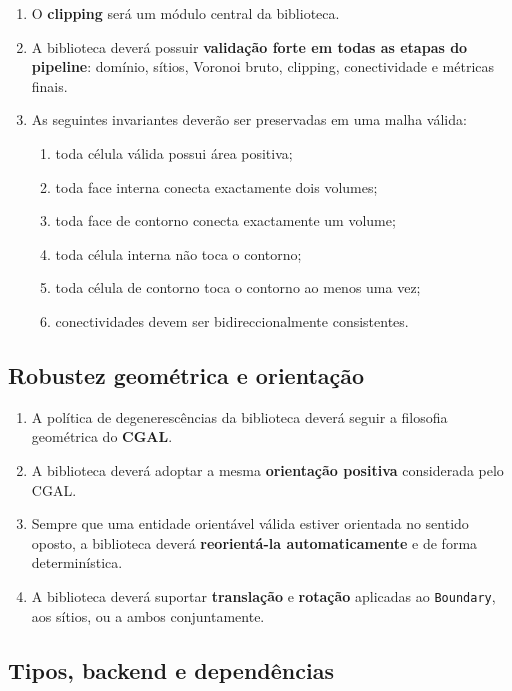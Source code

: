 \begin{enumerate}
    \item O \textbf{clipping} será um módulo central da biblioteca.
    \item A biblioteca deverá possuir \textbf{validação forte em todas as etapas do pipeline}: domínio, sítios, Voronoi bruto, clipping, conectividade e métricas finais.
    \item As seguintes invariantes deverão ser preservadas em uma malha válida:
    \begin{enumerate}
        \item toda célula válida possui área positiva;
        \item toda face interna conecta exactamente dois volumes;
        \item toda face de contorno conecta exactamente um volume;
        \item toda célula interna não toca o contorno;
        \item toda célula de contorno toca o contorno ao menos uma vez;
        \item conectividades devem ser bidireccionalmente consistentes.
    \end{enumerate}
\end{enumerate}

\subsection{Robustez geométrica e orientação}

\begin{enumerate}
    \item A política de degenerescências da biblioteca deverá seguir a filosofia geométrica do \textbf{CGAL}.
    \item A biblioteca deverá adoptar a mesma \textbf{orientação positiva} considerada pelo CGAL.
    \item Sempre que uma entidade orientável válida estiver orientada no sentido oposto, a biblioteca deverá \textbf{reorientá-la automaticamente} e de forma determinística.
    \item A biblioteca deverá suportar \textbf{translação} e \textbf{rotação} aplicadas ao \texttt{Boundary}, aos sítios, ou a ambos conjuntamente.
\end{enumerate}

\subsection{Tipos, backend e dependências}


